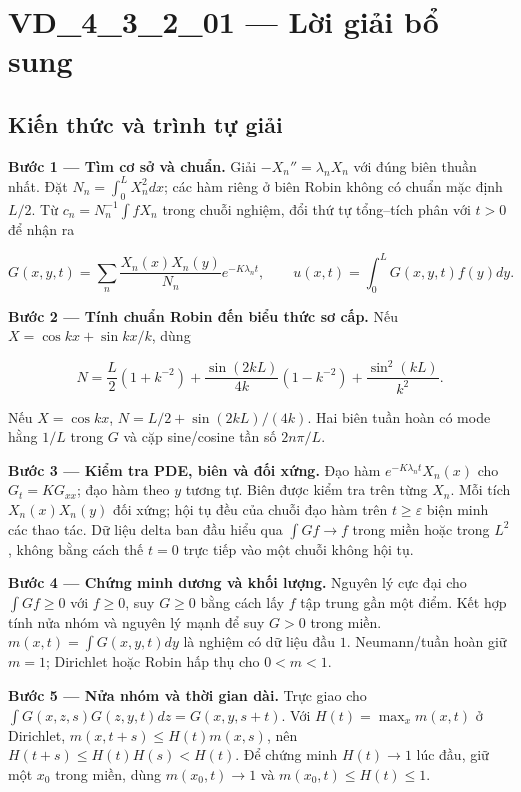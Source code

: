 \documentclass[10pt,a4paper]{article}
\begin{document}
\section*{VD\_4\_3\_2\_01 — Lời giải bổ sung}
\subsection*{Kiến thức và trình tự giải}
\textbf{Bước 1 — Tìm cơ sở và chuẩn.} Giải $-X_n''=\lambda_nX_n$ với đúng biên thuần nhất. Đặt $N_n=\int_0^LX_n^2dx$; các hàm riêng ở biên Robin không có chuẩn mặc định $L/2$. Từ $c_n=N_n^{-1}\int fX_n$ trong chuỗi nghiệm, đổi thứ tự tổng–tích phân với $t>0$ để nhận ra


\[
G(x,y,t)=\sum_n\frac{X_n(x)X_n(y)}{N_n}e^{-K\lambda_nt},\qquad
u(x,t)=\int_0^LG(x,y,t)f(y)dy.
\]


\textbf{Bước 2 — Tính chuẩn Robin đến biểu thức sơ cấp.} Nếu $X=\cos kx+\sin kx/k$, dùng


\[
N=\frac L2(1+k^{-2})+\frac{\sin(2kL)}{4k}(1-k^{-2})+\frac{\sin^2(kL)}{k^2}.
\]


Nếu $X=\cos kx$, $N=L/2+\sin(2kL)/(4k)$. Hai biên tuần hoàn có mode hằng $1/L$ trong $G$ và cặp sine/cosine tần số $2n\pi/L$.

\textbf{Bước 3 — Kiểm tra PDE, biên và đối xứng.} Đạo hàm $e^{-K\lambda_nt}X_n(x)$ cho $G_t=KG_{xx}$; đạo hàm theo $y$ tương tự. Biên được kiểm tra trên từng $X_n$. Mỗi tích $X_n(x)X_n(y)$ đối xứng; hội tụ đều của chuỗi đạo hàm trên $t\ge\varepsilon$ biện minh các thao tác. Dữ liệu delta ban đầu hiểu qua $\int Gf\to f$ trong miền hoặc trong $L^2$, không bằng cách thế $t=0$ trực tiếp vào một chuỗi không hội tụ.

\textbf{Bước 4 — Chứng minh dương và khối lượng.} Nguyên lý cực đại cho $\int Gf\ge0$ với $f\ge0$, suy $G\ge0$ bằng cách lấy $f$ tập trung gần một điểm. Kết hợp tính nửa nhóm và nguyên lý mạnh để suy $G>0$ trong miền. $m(x,t)=\int G(x,y,t)dy$ là nghiệm có dữ liệu đầu $1$. Neumann/tuần hoàn giữ $m=1$; Dirichlet hoặc Robin hấp thụ cho $0<m<1$.

\textbf{Bước 5 — Nửa nhóm và thời gian dài.} Trực giao cho $\int G(x,z,s)G(z,y,t)dz=G(x,y,s+t)$. Với $H(t)=\max_xm(x,t)$ ở Dirichlet, $m(x,t+s)\le H(t)m(x,s)$, nên $H(t+s)\le H(t)H(s)<H(t)$. Để chứng minh $H(t)\to1$ lúc đầu, giữ một $x_0$ trong miền, dùng $m(x_0,t)\to1$ và $m(x_0,t)\le H(t)\le1$.
\end{document}
